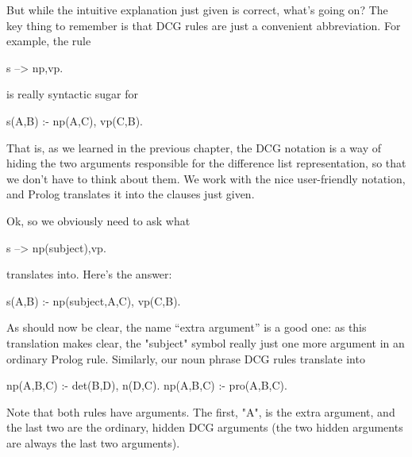 But while the intuitive explanation just given is correct, what's
 going on?  The key thing to remember is that DCG
rules are just a convenient abbreviation.  For example, the
rule
\begin{LPNcodedisplay}
s --> np,vp.
\end{LPNcodedisplay}
is really syntactic sugar for
\begin{LPNcodedisplay}
s(A,B) :-
    np(A,C),
    vp(C,B).
\end{LPNcodedisplay}
That is, as we learned in the previous chapter, the DCG notation is a
way of hiding the two arguments responsible for the difference list
representation, so that we don't have to think about them.  We work
with the nice user-friendly notation, and Prolog translates it into
the clauses just given.

Ok, so we obviously need to ask what
\begin{LPNcodedisplay}
s --> np(subject),vp.
\end{LPNcodedisplay}
translates into. Here's the answer:
\begin{LPNcodedisplay}
s(A,B) :-
    np(subject,A,C),
    vp(C,B).
\end{LPNcodedisplay}

As should now be clear, the name ``extra argument'' is a good one: as
this translation makes clear, the "subject" symbol really
 just one more argument in an ordinary Prolog rule.
Similarly, our noun phrase DCG rules translate into
\begin{LPNcodedisplay}
np(A,B,C) :-
    det(B,D),
    n(D,C).
np(A,B,C) :-
    pro(A,B,C).
\end{LPNcodedisplay}
Note that both rules have  arguments.  The first, "A",
is the extra argument, and the last two are the ordinary, hidden DCG
arguments (the two hidden arguments are always the last two
arguments).

